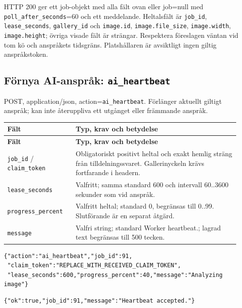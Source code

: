\documentclass[11pt,a4paper]{article}
\newcommand{\codeword}[1]{\nolinkurl{#1}}
\begin{document}
HTTP 200 ger ett job-objekt med alla fält ovan eller job=null med
\codeword{poll_after_seconds}=60 och ett meddelande. Heltalsfält är \codeword{job_id},
\codeword{lease_seconds}, \codeword{gallery_id} och \codeword{image.id},
\codeword{image.file_size}, \codeword{image.width}, \codeword{image.height}; övriga visade
fält är strängar. Respektera föreslagen väntan vid tom kö och anspråkets tidsgräns.
Platshållaren är avsiktligt ingen giltig anspråkstoken.

\subsection{\texorpdfstring{Förnya AI-anspråk: \codeword{ai_heartbeat}}{Förnya AI-anspråk: ai\_heartbeat}}

\label{api352:ai-heartbeat}

POST, application/json, action=\codeword{ai_heartbeat}. Förlänger aktuellt giltigt anspråk;
kan inte återuppliva ett utgånget eller främmande anspråk.

\begin{longtable}{@{}>{\RaggedRight\arraybackslash}p{0.28\linewidth}>{\RaggedRight\arraybackslash}p{0.67\linewidth}@{}}
\toprule
\textbf{Fält} & \textbf{Typ, krav och betydelse} \\
\midrule
\endfirsthead
\toprule
\textbf{Fält} & \textbf{Typ, krav och betydelse} \\
\midrule
\endhead
\bottomrule
\endfoot
\codeword{job_id} / \codeword{claim_token} & Obligatoriskt positivt heltal och exakt hemlig
sträng från tilldelningssvaret. Gallerinyckeln krävs fortfarande i headern. \\
\codeword{lease_seconds} & Valfritt; samma standard 600 och intervall 60..3600 sekunder som
vid anspråk. \\
\codeword{progress_percent} & Valfritt heltal; standard 0, begränsas till 0..99. Slutförande
är en separat åtgärd. \\
\codeword{message} & Valfri string; standard Worker heartbeat.; lagrad text begränsas till
500 tecken. \\
\end{longtable}

\begin{lstlisting}[language={}]
{"action":"ai_heartbeat","job_id":91,
 "claim_token":"REPLACE_WITH_RECEIVED_CLAIM_TOKEN",
 "lease_seconds":600,"progress_percent":40,"message":"Analyzing image"}
\end{lstlisting}

\begin{lstlisting}[language={}]
{"ok":true,"job_id":91,"message":"Heartbeat accepted."}
\end{lstlisting}
\end{document}
